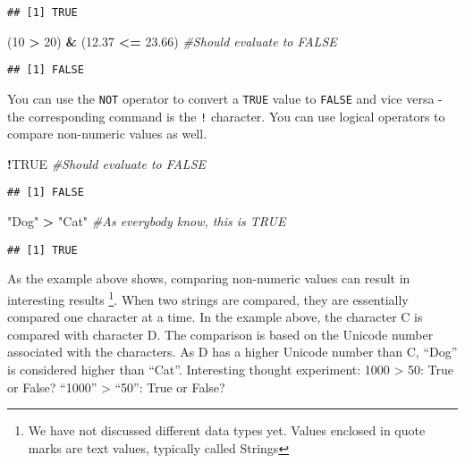 \documentclass[
]{krantz}
\makeatletter
\newenvironment{Shaded}{\begin{snugshade}}{\end{snugshade}}
\newcommand{\CommentTok}[1]{\textcolor[rgb]{0.37,0.37,0.37}{\textit{#1}}}
\newcommand{\DecValTok}[1]{\textcolor[rgb]{0.06,0.06,0.06}{#1}}
\newcommand{\FloatTok}[1]{\textcolor[rgb]{0.06,0.06,0.06}{#1}}
\newcommand{\NormalTok}[1]{#1}
\newcommand{\OperatorTok}[1]{\textcolor[rgb]{0.43,0.43,0.43}{\textbf{#1}}}
\newcommand{\OtherTok}[1]{\textcolor[rgb]{0.37,0.37,0.37}{#1}}
\newcommand{\StringTok}[1]{\textcolor[rgb]{0.5,0.5,0.5}{#1}}
\newenvironment{kframe}{%
\medskip{}
\setlength{\fboxsep}{.8em}
 \def\at@end@of@kframe{}%
 \ifinner\ifhmode%
  \def\at@end@of@kframe{\end{minipage}}%
  \begin{minipage}{\columnwidth}%
 \fi\fi%
 \def\FrameCommand##1{\hskip\@totalleftmargin \hskip-\fboxsep
 \colorbox{shadecolor}{##1}\hskip-\fboxsep
     \hskip-\linewidth \hskip-\@totalleftmargin \hskip\columnwidth}%
 \MakeFramed {\advance\hsize-\width
   \@totalleftmargin\z@ \linewidth\hsize
   \@setminipage}}%
 {\par\unskip\endMakeFramed%
 \at@end@of@kframe}
\renewenvironment{Shaded}{\begin{kframe}}{\end{kframe}}
\makeatother
\begin{document}
\begin{verbatim}
## [1] TRUE
\end{verbatim}

\begin{Shaded}
\begin{Highlighting}[]
\NormalTok{(}\DecValTok{10} \OperatorTok{>}\StringTok{ }\DecValTok{20}\NormalTok{) }\OperatorTok{&}\StringTok{ }\NormalTok{(}\FloatTok{12.37} \OperatorTok{<=}\StringTok{ }\FloatTok{23.66}\NormalTok{) }\CommentTok{#Should evaluate to FALSE}
\end{Highlighting}
\end{Shaded}

\begin{verbatim}
## [1] FALSE
\end{verbatim}

You can use the \texttt{NOT} operator to convert a \texttt{TRUE} value to \texttt{FALSE} and vice versa - the corresponding command is the \texttt{!} character. You can use logical operators to compare non-numeric values as well.

\begin{Shaded}
\begin{Highlighting}[]
\OperatorTok{!}\OtherTok{TRUE} \CommentTok{#Should evaluate to FALSE}
\end{Highlighting}
\end{Shaded}

\begin{verbatim}
## [1] FALSE
\end{verbatim}

\begin{Shaded}
\begin{Highlighting}[]
\StringTok{"Dog"} \OperatorTok{>}\StringTok{ "Cat"} \CommentTok{#As everybody know, this is TRUE}
\end{Highlighting}
\end{Shaded}

\begin{verbatim}
## [1] TRUE
\end{verbatim}

As the example above shows, comparing non-numeric values can result in interesting results \footnote{We have not discussed different data types yet. Values enclosed in quote marks are text values, typically called Strings}. When two strings are compared, they are essentially compared one character at a time. In the example above, the character C is compared with character D. The comparison is based on the Unicode number associated with the characters. As D has a higher Unicode number than C, ``Dog'' is considered higher than ``Cat''. Interesting thought experiment: 1000 \textgreater{} 50: True or False? ``1000'' \textgreater{} ``50'': True or False?
\end{document}
